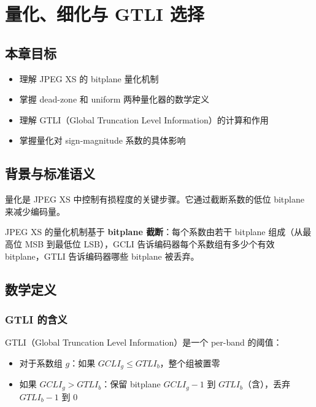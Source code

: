 
\chapter{量化、细化与 GTLI 选择}\label{ch:quantization}

\section{本章目标}

\begin{itemize}
  \item 理解 JPEG XS 的 bitplane 量化机制
  \item 掌握 dead-zone 和 uniform 两种量化器的数学定义
  \item 理解 GTLI（Global Truncation Level Information）的计算和作用
  \item 掌握量化对 sign-magnitude 系数的具体影响
\end{itemize}

\section{背景与标准语义}

量化是 JPEG XS 中控制有损程度的关键步骤。它通过截断系数的低位 bitplane 来减少编码量。

JPEG XS 的量化机制基于 \textbf{bitplane 截断}：每个系数由若干 bitplane 组成（从最高位 MSB 到最低位 LSB），GCLI 告诉编码器每个系数组有多少个有效 bitplane，GTLI 告诉编码器哪些 bitplane 被丢弃。

\section{数学定义}

\subsection{GTLI 的含义}

GTLI（Global Truncation Level Information）是一个 per-band 的阈值：
\begin{itemize}
  \item 对于系数组 $g$：如果 $\mathit{GCLI}_g \leq \mathit{GTLI}_b$，整个组被置零
  \item 如果 $\mathit{GCLI}_g > \mathit{GTLI}_b$：保留 bitplane $\mathit{GCLI}_g - 1$ 到 $\mathit{GTLI}_b$（含），丢弃 $\mathit{GTLI}_b - 1$ 到 $0$
\end{itemize}

